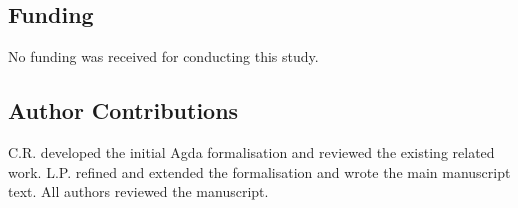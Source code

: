 \documentclass[pdflatex,sn-mathphys-num]{sn-jnl}
\begin{document}
\subsection*{Funding}

No funding was received for conducting this study.

\subsection*{Author Contributions}

C.R. developed the initial Agda formalisation and reviewed the existing related work. L.P. refined and extended the formalisation and wrote the main manuscript text. All authors reviewed the manuscript.


\end{document}
